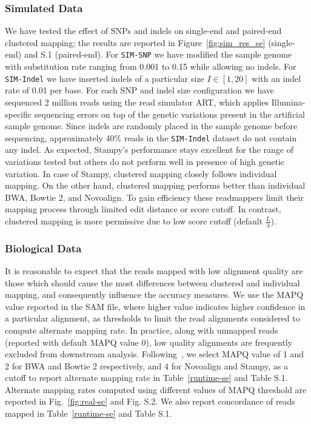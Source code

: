\documentclass[a4paper]{article}
\begin{document}
\subsubsection{Simulated Data}
We have tested the effect of SNPs and indels on single-end and
paired-end clustered mapping; the results are reported in
Figure~\ref{fig:sim_res_se} (single-end) and S.1 (paired-end). For {\tt SIM-SNP} we have modified the sample
genome with substitution rate ranging from 0.001 to 0.15 while allowing
no indels. For {\tt SIM-Indel} we have inserted indels of a particular size
$I\in [1, 20]$ with an indel rate of 0.01 per base.
For each SNP and indel size configuration we have sequenced 2 million
reads using the read simulator ART, which applies Illumina-specific
sequencing errors on top of the genetic variations present in the
artificial sample genome.
Since indels are randomly placed in the sample genome
before sequencing, approximately 40\% reads in the {\tt SIM-Indel}
dataset do not contain any indel. As expected, Stampy's performance stays
excellent for the range of variations tested but others do not perform well
in presence of high genetic variation. In case of Stampy,
clustered mapping closely follows individual mapping.
On the other hand, clustered mapping performs better
than individual BWA, Bowtie 2, and Novoalign.
To gain efficiency these readmappers limit their mapping process through
limited edit distance or score cutoff.
In contrast, clustered mapping is more permissive due to low
score cutoff (default $\frac{L}{3}$).

\subsubsection{Biological Data}
It is reasonable to expect that the reads mapped with low alignment quality are those which should cause the most differences between clustered and individual mapping, and consequently influence the accuracy measures. We use the MAPQ value reported in the SAM file, where higher value indicates higher confidence in a particular alignment, as thresholds to limit the read alignments considered to compute alternate mapping rate. In practice, along with unmapped reads (reported with default MAPQ value 0), low quality alignments are frequently excluded from downstream analysis.  Following~\cite{Li15072009}, we select MAPQ value of 1 and 2 for BWA and Bowtie 2 respectively, and 4 for Novoalign and Stampy, as a cutoff to report alternate mapping rate in Table~\ref{runtime-se} and Table S.1. Alternate mapping rates computed using different values of MAPQ threshold are reported in Fig.~\ref{fig:real-se} and Fig. S.2. We also report concordance of reads mapped in Table~\ref{runtime-se} and Table S.1.
\end{document}
